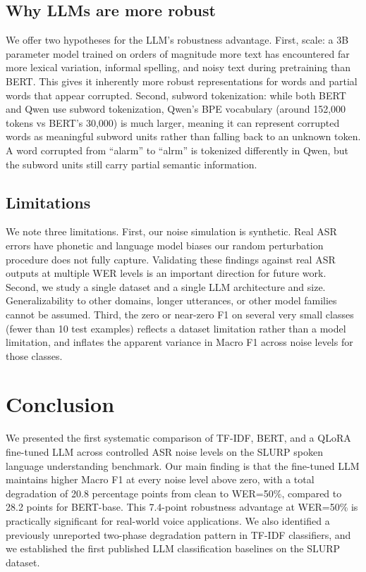 \documentclass[11pt,a4paper]{article}
\begin{document}
\subsection{Why LLMs are more robust}

We offer two hypotheses for the LLM's robustness advantage. First, scale: a 3B parameter model trained on orders of magnitude more text has encountered far more lexical variation, informal spelling, and noisy text during pretraining than BERT. This gives it inherently more robust representations for words and partial words that appear corrupted. Second, subword tokenization: while both BERT and Qwen use subword tokenization, Qwen's BPE vocabulary (around 152,000 tokens vs BERT's 30,000) is much larger, meaning it can represent corrupted words as meaningful subword units rather than falling back to an unknown token. A word corrupted from ``alarm'' to ``alrm'' is tokenized differently in Qwen, but the subword units still carry partial semantic information.

\subsection{Limitations}

We note three limitations. First, our noise simulation is synthetic. Real ASR errors have phonetic and language model biases our random perturbation procedure does not fully capture. Validating these findings against real ASR outputs at multiple WER levels is an important direction for future work. Second, we study a single dataset and a single LLM architecture and size. Generalizability to other domains, longer utterances, or other model families cannot be assumed. Third, the zero or near-zero F1 on several very small classes (fewer than 10 test examples) reflects a dataset limitation rather than a model limitation, and inflates the apparent variance in Macro F1 across noise levels for those classes.

\section{Conclusion}

We presented the first systematic comparison of TF-IDF, BERT, and a QLoRA fine-tuned LLM across controlled ASR noise levels on the SLURP spoken language understanding benchmark. Our main finding is that the fine-tuned LLM maintains higher Macro F1 at every noise level above zero, with a total degradation of 20.8 percentage points from clean to WER=50\%, compared to 28.2 points for BERT-base. This 7.4-point robustness advantage at WER=50\% is practically significant for real-world voice applications. We also identified a previously unreported two-phase degradation pattern in TF-IDF classifiers, and we established the first published LLM classification baselines on the SLURP dataset.
\end{document}
